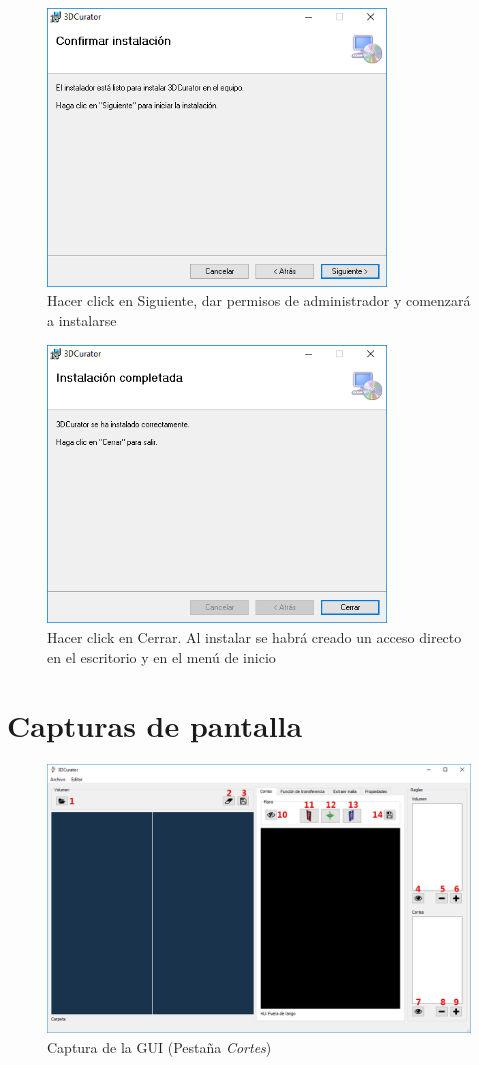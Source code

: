 \begin{figure}[H]
	\centering
	\includegraphics[width=9cm]{imagenes/instalacion_3}
	\caption{Hacer click en Siguiente,  dar permisos de administrador y comenzará a instalarse}
	\label{fig:instalacion_3}
\end{figure}

\begin{figure}[H]
	\centering
	\includegraphics[width=9cm]{imagenes/instalacion_4}
	\caption{Hacer click en Cerrar. Al instalar se habrá creado un acceso directo en el escritorio y en el menú de inicio}
	\label{fig:instalacion_4}
\end{figure}

\section{Capturas de pantalla}

\begin{figure}[H]
	\centering
	\includegraphics[width=12.5cm]{imagenes/gui_1}
	\caption{Captura de la GUI (Pestaña \textit{Cortes})}
	\label{fig:gui_1}
\end{figure}

